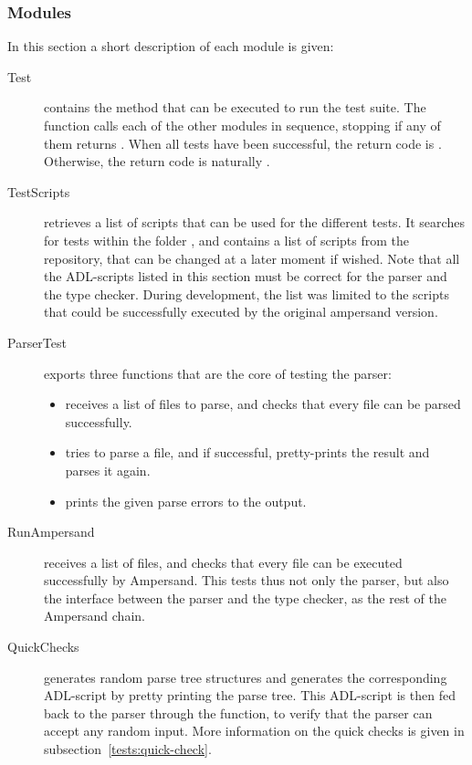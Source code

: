   \subsubsection{Modules}
  \label{tests:test-modules}
  In this section a short description of each module is given:%
  \begin{description}
    \item[Test] contains the  method that can be executed to run the test suite.
      The  function calls each of the other modules in sequence, stopping if any of them returns .
      When all tests have been successful, the return code is .
      Otherwise, the return code is naturally .
    
    \item[TestScripts] retrieves a list of scripts that can be used for the different tests.
      It searches for tests within the folder , and contains a list of scripts from the  repository, that can be changed at a later moment if wished.
      Note that all the ADL-scripts listed in this section must be correct for the parser and the type checker.
      During development, the list was limited to the scripts that could be successfully executed by the original ampersand version.
    
    \item[ParserTest] exports three functions that are the core of testing the parser:
      \begin{itemize}
        \item {} receives a list of files to parse, and checks that every file can be parsed successfully.
        \item {} tries to parse a file, and if successful, pretty-prints the result and parses it again.
        \item {} prints the given parse errors to the output.
      \end{itemize}
    
    \item[RunAmpersand] receives a list of files, and checks that every file can be executed successfully by Ampersand.
      This tests thus not only the parser, but also the interface between the parser and the type checker, as the rest of the Ampersand chain.
    
    \item[QuickChecks] generates random parse tree structures and generates the corresponding ADL-script by pretty printing the parse tree.
      This ADL-script is then fed back to the parser through the  function, to verify that the parser can accept any random input.
      More information on the quick checks is given in subsection~\ref{tests:quick-check}.
    

\end{description}
